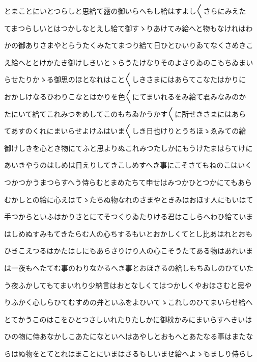 \documentclass[a4paper,11pt,landscape]{ltjtarticle}
\begin{document}
\par\medskip
とまことにいとつらしと思給て露の御いらへもし給はすよし〱さらにみえた
\par\medskip
てまつらしいとはつかしなとえし給て御すゝりあけてみ給へと物もなけれはわ
\par\medskip
かの御ありさまやとらうたくみたてまつり給て日ひとひいりゐてなくさめきこ
\par\medskip
え給へととけかたき御けしきいとゝらうたけなりそのよさりゐのこもちゐまい
\par\medskip
らせたりかゝる御思のほとなれはこと〱しきさまにはあらてこなたはかりに
\par\medskip
おかしけなるひわりこなとはかりを色〱にてまいれるをみ給て君みなみのか
\par\medskip
たにいて給てこれみつをめしてこのもちゐかうかす〱に所せきさまにはあら
\par\medskip
てあすのくれにまいらせよけふはいま〱しき日也けりとうちほゝゑみての給
\par\medskip
御けしきを心とき物にてふと思よりぬこれみつたしかにもうけたまはらてけに
\par\medskip
あいきやうのはしめは日えりしてきこしめすへき事にこそさてもねのこはいく
\par\medskip
つかつかうまつらすへう侍らむとまめたちて申せはみつかひとつかにてもあら
\par\medskip
むかしとの給に心えはてゝたちぬ物なれのさまやときみはおほす人にもいはて
\par\medskip
手つからといふはかりさとにてそつくりゐたりける君はこしらへわひ給ていま
\par\medskip
はしめぬすみもてきたらむ人の心ちするもいとおかしくてとし比あはれとおも
\par\medskip
ひきこえつるはかたはしにもあらさりけり人の心こそうたてある物はあれいま
\par\medskip
は一夜もへたてむ事のわりなかるへき事とおほさるの給しもちゐしのひていた
\par\medskip
う夜ふかしてもてまいれり少納言はおとなしくてはつかしくやおほさむと思や
\par\medskip
りふかく心しらひてむすめの弁といふをよひいてゝこれしのひてまいらせ給へ
\par\medskip
とてかうこのはこをひとつさしいれたりたしかに御枕かみにまいらすへきいは
\par\medskip
ひの物に侍あなかしこあたになといへはあやしとおもへとあたなる事はまたな
\par\medskip
らはぬ物をとてとれはまことにいまはさるもしいませ給へよゝもましり侍らし
\par\medskip
\end{document}
